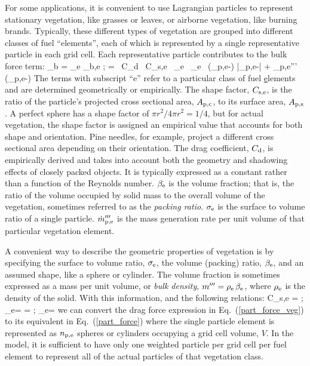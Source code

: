 For some applications, it is convenient to use Lagrangian particles to represent stationary vegetation, like grasses or leaves, or airborne vegetation, like burning brands. Typically, these different types of vegetation are grouped into different classes of fuel ``elements'', each of which is represented by a single representative particle in each grid cell. Each representative particle contributes to the bulk force term:
\be
    {\bof_{\rm b}} = \sum_{\rm e} {\bof_{\rm b,e}} \quad ;  =  \, C_{\rm d} \, C_{\rm s,e} \,  \beta_{\rm e} \, \sigma_{\rm e} \, (\bu_{\rm p,e}-\bu) |\bu_{\rm p,e}-\bu| + _{\rm p,e}''' \, (\bu_{\rm p,e}-\bu)   \label{part_force_veg}
\ee
The terms with subscript ``e'' refer to a particular class of fuel \underline{e}lements and are determined geometrically or empirically.  The shape factor, $C_{\rm s,e}$, is the ratio of the particle's projected cross sectional area, $A_{\rm p,c}$, to its surface area, $A_{\rm p,s}$. A perfect sphere has a shape factor of $\pi r^2/4 \pi r^2=1/4$, but for actual vegetation, the shape factor is assigned an empirical value that accounts for both shape and orientation. Pine needles, for example, project a different cross sectional area depending on their orientation. The drag coefficient, $C_{\rm d}$, is empirically derived and takes into account both the geometry and shadowing effects of closely packed objects. It is typically expressed as a constant rather than a function of the Reynolds number.  $\beta_{\rm e}$ is the volume fraction; that is, the ratio of the volume occupied by solid mass to the overall volume of the vegetation, sometimes referred to as the {\em packing ratio}. $\sigma_{\rm e}$ is the surface to volume ratio of a single particle. $\dot{m}_{\rm p,e}'''$ is the mass generation rate per unit volume of that particular vegetation element.

A convenient way to describe the geometric properties of vegetation is by specifying the surface to volume ratio, $\sigma_{\rm e}$, the volume (packing) ratio, $\beta_{\rm e}$, and an assumed shape, like a sphere or cylinder. The volume fraction is sometimes expressed as a mass per unit volume, or {\em bulk density}, $m'''=\rho_{\rm e} \, \beta_{\rm e}$, where $\rho_{\rm e}$ is the density of the solid. With this information, and the following relations:
\be
   C_{\rm s,e} =  \quad ; \quad  \beta_{\rm e}= =  \quad ; \quad \sigma_{\rm e}=
\ee
we can convert the drag force expression in Eq.~(\ref{part_force_veg}) to its equivalent in Eq.~(\ref{part_force}) where the single particle element is represented as $n_{\rm p,e}$ spheres or cylinders occupying a grid cell volume, $V$. In the model, it is sufficient to have only one weighted particle per grid cell per fuel element to represent all of the actual particles of that vegetation class.


